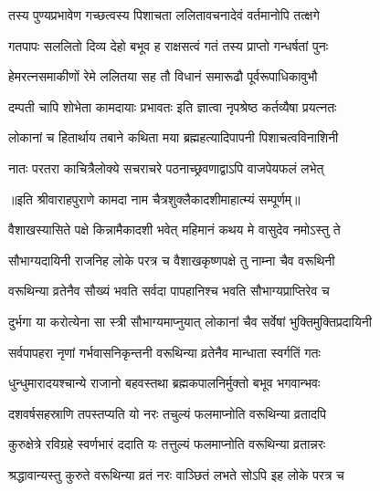 \twolineshloka
{तस्य पुण्यप्रभावेण गच्छत्वस्य पिशाचता}
{ललितावचनादेवं वर्तमानोपि तत्क्षगे} %

\twolineshloka
{गतपापः सललितो दिव्य देहो बभूव ह}
{राक्षसत्वं गतं तस्य प्राप्तो गन्धर्षतां पुनः} %

\twolineshloka
{हेमरत्नसमाकीणों रेमे ललितया सह}
{तौ विधानं समारूढौ पूर्वरूपाधिकावुभौ} %

\twolineshloka
{दम्पती चापि शोभेता कामदायाः प्रभावतः}
{इति ज्ञात्वा नृपश्रेष्ठ कर्तव्यैषा प्रयत्नतः} %

\twolineshloka
{लोकानां च हितार्थाय तबाने कथिता मया}
{ब्रह्महत्यादिपापनी पिशाचत्वविनाशिनी} %

\twolineshloka
{नातः परतरा काचित्रैलोक्ये सचराचरे}
{पठनाच्छ्रवणाद्वाऽपि वाजपेयफलं लभेत्} %

॥इति श्रीवाराहपुराणे कामदा नाम चैत्रशुक्लैकादशीमाहात्म्यं सम्पूर्णम्॥


\hyperref[sec:ekadashi_mahatmyam_vrata_raja]{\closesub}
\clearpage

\label{sec:vrata-raja-vaishakha-krishna-varuthini}


\twolineshloka
{वैशाखस्यासिते पक्षे किन्नामैकादशी भवेत्}
{महिमानं कथय मे वासुदेव नमोऽस्तु ते} %


\twolineshloka
{सौभाग्यदायिनी राजनिह लोके परत्र च}
{वैशाखकृष्णपक्षे तु नाम्ना चैव वरूथिनी} %

\twolineshloka
{वरूथिन्या व्रतेनैव सौख्यं भवति सर्वदा}
{पापहानिश्च भवति सौभाग्यप्राप्तिरेव च} %

\twolineshloka
{दुर्भगा या करोत्येना सा स्त्री सौभाग्यमाप्नुयात्}
{लोकानां चैव सर्वेषां भुक्तिमुक्तिप्रदायिनी} %

\twolineshloka
{सर्वपापहरा नृणां गर्भवासनिकृन्तनी}
{वरूथिन्या व्रतेनैव मान्धाता स्वर्गतिं गतः} %

\twolineshloka
{धुन्धुमारादयश्चान्ये राजानो बहवस्तथा}
{ब्रह्मकपालनिर्मुक्तो बभूव भगवान्भवः} %

\twolineshloka
{दशवर्षसहस्राणि तपस्तप्यति यो नरः}
{तचुल्यं फलमाप्नोति वरूथिन्या व्रतादपि} %

\twolineshloka
{कुरुक्षेत्रे रविग्रहे स्वर्णभारं ददाति यः}
{तत्तुल्यं फलमाप्नोति वरूथिन्या व्रतान्नरः} %

\twolineshloka
{श्रद्धावान्यस्तु कुरुते वरूथिन्या व्रतं नरः}
{वाञ्छितं लभते सोऽपि इह लोके परत्र च} %

